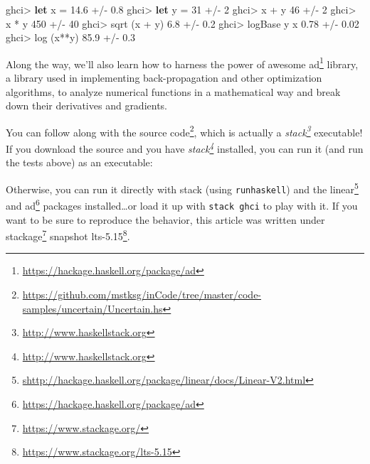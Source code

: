 \documentclass[]{article}
\newenvironment{Shaded}{}{}
\newcommand{\DecValTok}[1]{\textcolor[rgb]{0.25,0.63,0.44}{#1}}
\newcommand{\ExtensionTok}[1]{#1}
\newcommand{\FloatTok}[1]{\textcolor[rgb]{0.25,0.63,0.44}{#1}}
\newcommand{\FunctionTok}[1]{\textcolor[rgb]{0.02,0.16,0.49}{#1}}
\newcommand{\KeywordTok}[1]{\textcolor[rgb]{0.00,0.44,0.13}{\textbf{#1}}}
\newcommand{\NormalTok}[1]{#1}
\newcommand{\OperatorTok}[1]{\textcolor[rgb]{0.40,0.40,0.40}{#1}}
\newcommand{\OtherTok}[1]{\textcolor[rgb]{0.00,0.44,0.13}{#1}}
\renewcommand{\href}[2]{#2\footnote{\url{#1}}}
\begin{document}
\begin{Shaded}
\begin{Highlighting}[]
\NormalTok{ghci}\OperatorTok{\textgreater{}} \KeywordTok{let}\NormalTok{ x }\OtherTok{=} \FloatTok{14.6} \OperatorTok{+/{-}} \FloatTok{0.8}
\NormalTok{ghci}\OperatorTok{\textgreater{}} \KeywordTok{let}\NormalTok{ y }\OtherTok{=} \DecValTok{31}   \OperatorTok{+/{-}} \DecValTok{2}
\NormalTok{ghci}\OperatorTok{\textgreater{}}\NormalTok{ x }\OperatorTok{+}\NormalTok{ y}
\DecValTok{46} \OperatorTok{+/{-}} \DecValTok{2}
\NormalTok{ghci}\OperatorTok{\textgreater{}}\NormalTok{ x }\OperatorTok{*}\NormalTok{ y}
\DecValTok{450} \OperatorTok{+/{-}} \DecValTok{40}
\NormalTok{ghci}\OperatorTok{\textgreater{}} \FunctionTok{sqrt}\NormalTok{ (x }\OperatorTok{+}\NormalTok{ y)}
\FloatTok{6.8} \OperatorTok{+/{-}} \FloatTok{0.2}
\NormalTok{ghci}\OperatorTok{\textgreater{}} \FunctionTok{logBase}\NormalTok{ y x}
\FloatTok{0.78} \OperatorTok{+/{-}} \FloatTok{0.02}
\NormalTok{ghci}\OperatorTok{\textgreater{}} \FunctionTok{log}\NormalTok{ (x}\OperatorTok{**}\NormalTok{y)}
\FloatTok{85.9} \OperatorTok{+/{-}} \FloatTok{0.3}
\end{Highlighting}
\end{Shaded}

Along the way, we'll also learn how to harness the power of awesome
\href{https://hackage.haskell.org/package/ad}{ad} library, a library used in
implementing back-propagation and other optimization algorithms, to analyze
numerical functions in a mathematical way and break down their derivatives and
gradients.

You can follow along with
\href{https://github.com/mstksg/inCode/tree/master/code-samples/uncertain/Uncertain.hs}{the
source code}, which is actually a
\emph{\href{http://www.haskellstack.org}{stack}} executable! If you download the
source and you have \emph{\href{http://www.haskellstack.org}{stack}} installed,
you can run it (and run the tests above) as an executable:

\begin{Shaded}
\end{Shaded}

Otherwise, you can run it directly with stack (using \texttt{runhaskell}) and
the
\href{shttp://hackage.haskell.org/package/linear/docs/Linear-V2.html}{linear}
and \href{https://hackage.haskell.org/package/ad}{ad} packages
installed\ldots or load it up with \texttt{stack\ ghci} to play with it. If you
want to be sure to reproduce the behavior, this article was written under
\href{https://www.stackage.org/}{stackage} snapshot
\href{https://www.stackage.org/lts-5.15}{lts-5.15}.
\end{document}
